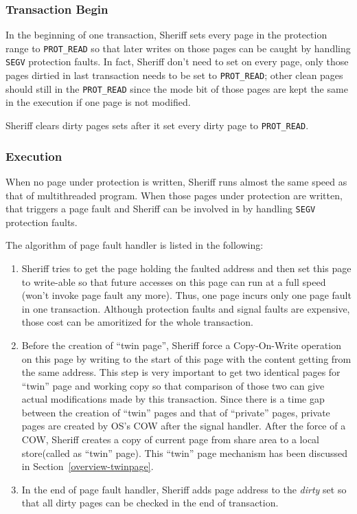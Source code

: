 \subsubsection{Transaction Begin}
In the beginning of one transaction, Sheriff sets every page in the protection range to \texttt{PROT\_READ} so that
later writes on those pages can be caught by handling \texttt{SEGV} protection faults.
In fact, Sheriff don't need to set on every page, only those pages dirtied in last transaction needs to be
set to \texttt{PROT\_READ}; other clean pages should still in the \texttt{PROT\_READ} 
since the mode bit of those pages are kept the same
in the execution if one page is not modified.

Sheriff clears dirty pages sets after it set every dirty page to \texttt{PROT\_READ}.

\subsubsection{Execution}
\label{simulation:execution}
When no page under protection is written, Sheriff runs almost the same speed as that of multithreaded program. 
When those pages under protection are written, that triggers a page fault and Sheriff can
be involved in by handling \texttt{SEGV} protection faults.
 
The algorithm of page fault handler is listed in the following:
\begin{enumerate}
\item 
Sheriff tries to get the page holding the faulted address and then set this page to write-able so that 
future accesses on this page can run at a full speed (won't invoke page fault any more). 
Thus, one page incurs only one page fault in one transaction. 
Although protection faults and signal faults are expensive, those cost 
can be amoritized for the whole transaction.

\item 
Before the creation of ``twin page'', Sheriff force a Copy-On-Write operation on this page by writing to the start of this page 
with the content getting from the same address. 
This step is very important to get two identical pages for ``twin'' page and working copy 
so that comparison of those two can give actual modifications made by this transaction. 
Since there is a time gap between the creation of ``twin'' pages and that of ``private'' pages, private pages are created 
by OS's COW after the signal handler. 
After the force of a COW, Sheriff creates a copy of current page from share area to a local store(called as ``twin'' page). 
This ``twin'' page mechanism has been discussed in Section~\ref{overview-twinpage}.
\item 
In the end of page fault handler, Sheriff adds page address to the \textit{dirty} set so that 
all dirty pages can be checked in the end of transaction.
\end{enumerate}

